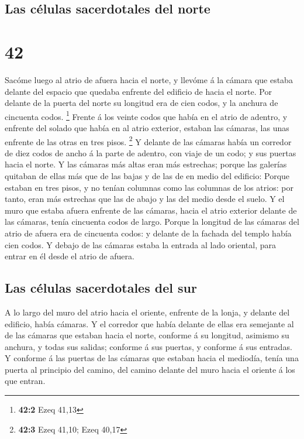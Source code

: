 \hypertarget{las-cuxe9lulas-sacerdotales-del-norte}{%
\subsection{Las células sacerdotales del
norte}\label{las-cuxe9lulas-sacerdotales-del-norte}}

\hypertarget{section-41}{%
\section{42}\label{section-41}}

 Sacóme luego al atrio de afuera hacia el norte, y llevóme á
la cámara que estaba delante del espacio que quedaba enfrente del
edificio de hacia el norte.  Por delante de la puerta del
norte su longitud era de cien codos, y la anchura de cincuenta codos.
\footnote{\textbf{42:2} Ezeq 41,13}  Frente á los veinte
codos que había en el atrio de adentro, y enfrente del solado que había
en al atrio exterior, estaban las cámaras, las unas enfrente de las
otras en tres pisos. \footnote{\textbf{42:3} Ezeq 41,10; Ezeq 40,17}
 Y delante de las cámaras había un corredor de diez codos de
ancho á la parte de adentro, con viaje de un codo; y sus puertas hacia
el norte.  Y las cámaras más altas eran más estrechas;
porque las galerías quitaban de ellas más que de las bajas y de las de
en medio del edificio:  Porque estaban en tres pisos, y no
tenían columnas como las columnas de los atrios: por tanto, eran más
estrechas que las de abajo y las del medio desde el suelo. 
Y el muro que estaba afuera enfrente de las cámaras, hacia el atrio
exterior delante de las cámaras, tenía cincuenta codos de largo.
 Porque la longitud de las cámaras del atrio de afuera era
de cincuenta codos: y delante de la fachada del templo había cien codos.
 Y debajo de las cámaras estaba la entrada al lado oriental,
para entrar en él desde el atrio de afuera.

\hypertarget{las-cuxe9lulas-sacerdotales-del-sur}{%
\subsection{Las células sacerdotales del
sur}\label{las-cuxe9lulas-sacerdotales-del-sur}}

 A lo largo del muro del atrio hacia el oriente, enfrente
de la lonja, y delante del edificio, había cámaras.  Y el
corredor que había delante de ellas era semejante al de las cámaras que
estaban hacia el norte, conforme á su longitud, asimismo su anchura, y
todas sus salidas; conforme á sus puertas, y conforme á sus entradas.
 Y conforme á las puertas de las cámaras que estaban hacia
el mediodía, tenía una puerta al principio del camino, del camino
delante del muro hacia el oriente á los que entran.

